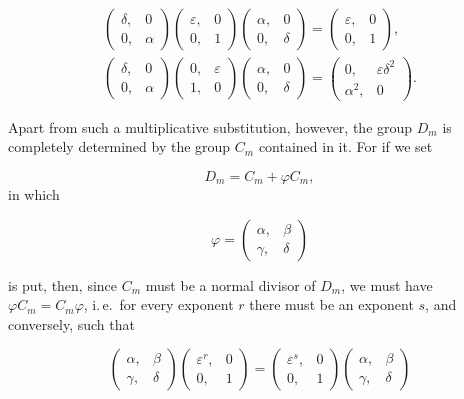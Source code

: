 \[
\begin{gathered}
\begin{pmatrix} \delta, & 0 \\ 0, & \alpha \end{pmatrix}
\begin{pmatrix} \varepsilon, & 0 \\ 0, & 1 \end{pmatrix}
\begin{pmatrix} \alpha, & 0 \\ 0, & \delta \end{pmatrix}
=
\begin{pmatrix} \varepsilon, & 0 \\ 0, & 1 \end{pmatrix},\\[6pt]
\begin{pmatrix} \delta, & 0 \\ 0, & \alpha \end{pmatrix}
\begin{pmatrix} 0, & \varepsilon \\ 1, & 0 \end{pmatrix}
\begin{pmatrix} \alpha, & 0 \\ 0, & \delta \end{pmatrix}
=
\begin{pmatrix} 0, & \varepsilon \delta^2 \\ \alpha^2, & 0 \end{pmatrix}.
\end{gathered}
\]

Apart from such a multiplicative substitution, however,
the group $D_m$ is completely determined by the group $C_m$
contained in it. For if we set

\[
D_m = C_m + \varphi C_m,
\]
in which

\[
\varphi = \begin{pmatrix} \alpha, & \beta \\ \gamma, & \delta \end{pmatrix}
\]

is put, then, since $C_m$ must be a normal divisor of $D_m$, we must
have $\varphi C_m = C_m \varphi$, i.\,e.\ for every exponent $r$ there must
be an exponent $s$, and conversely, such that

\[
\begin{pmatrix} \alpha, & \beta \\ \gamma, & \delta \end{pmatrix}
\begin{pmatrix} \varepsilon^r, & 0 \\ 0, & 1 \end{pmatrix}
=
\begin{pmatrix} \varepsilon^s, & 0 \\ 0, & 1 \end{pmatrix}
\begin{pmatrix} \alpha, & \beta \\ \gamma, & \delta \end{pmatrix}
\]
